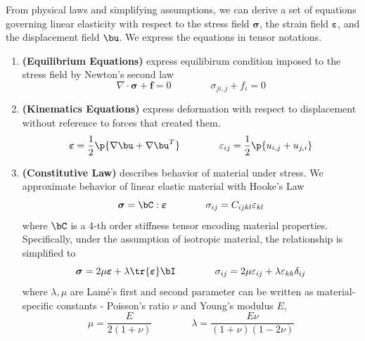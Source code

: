 \documentclass[11pt,titlepage]{article}
\newcommand{\bheading}[1]{\textbf{(#1)}}
\newcommand{\bsigma}{\boldsymbol{\sigma}}
\newcommand{\bepsilon}{\boldsymbol{\varepsilon}}
\renewcommand{\epsilon}{\varepsilon}
\renewcommand{\bf}{\mathbf{f}}
\begin{document}
From physical laws and simplifying assumptions, we can derive a set of equations governing linear elasticity with respect to the stress field $\bsigma$, the strain field $\bepsilon$, and the displacement field $\bu$. We express the equations in tensor notations.
\begin{enumerate}
    \item \bheading{Equilibrium Equations} express equilibirum condition imposed to the stress field by Newton's second law
    \[
        \nabla\cdot\bsigma + \bf = 0
        \quad\quad\quad\quad
        \sigma_{ji,j} + f_i = 0
    \]
    \item \bheading{Kinematics Equations} express deformation with respect to displacement without reference to forces that created them. 
    \[
        \bepsilon = \dfrac{1}{2} \p{
            \nabla \bu + \nabla\bu^T
        }
        \quad\quad\quad\quad
        \epsilon_{ij} = 
            \frac{1}{2} \p{
                u_{i,j} + u_{j,i}
            }
    \]
    \item \bheading{Constitutive Law} describes behavior of material under stress. We approximate behavior of linear elastic material with Hooke's Law
    \[
        \bsigma = \bC : \bepsilon
        \quad\quad\quad\quad
        \sigma_{ij} = C_{ijkl} \epsilon_{kl}
    \]
    where $\bC$ is a 4-th order stiffness tensor encoding material properties. Specifically, under the assumption of isotropic material, the relationship is simplified to 
    \[
        \bsigma = 2\mu\bepsilon + \lambda \tr{\bepsilon} \bI
        \quad\quad\quad\quad
        \sigma_{ij} = 2\mu \epsilon_{ij} + \lambda \epsilon_{kk} \delta_{ij}
    \]
    where $\lambda,\mu$ are Lam\'{e}'s first and second parameter can be written as material-specific constants - Poisson's ratio $\nu$ and Young's modulus $E$,
    \[
        \mu = \frac{E}{2(1+\nu)}
        \quad\quad\quad\quad
        \lambda = \frac{E\nu}{(1+\nu)(1-2\nu)}
    \]
\end{enumerate}
\end{document}
